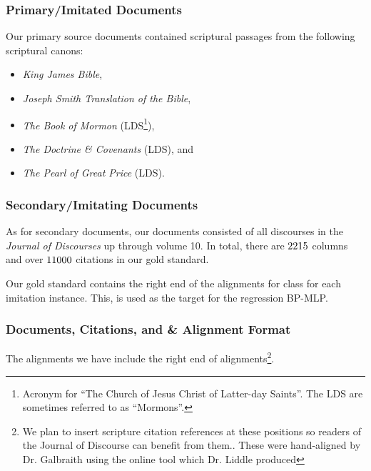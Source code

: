 \subsubsection{Primary/Imitated Documents}
Our primary source documents contained scriptural passages from the following scriptural canons:
	\begin{itemize}
		\item \textit{King James Bible},
		\item \textit{Joseph Smith Translation of the Bible},
		\item \textit{The Book of Mormon} (LDS\footnote{Acronym for ``The Church of Jesus Christ of Latter-day Saints''. The LDS are sometimes referred to as ``Mormons''.}),
		\item \textit{The Doctrine \& Covenants} (LDS), and
		\item \textit{The Pearl of Great Price} (LDS). 
	\end{itemize}

\subsubsection{Secondary/Imitating Documents}
As for secondary documents, our documents consisted of all discourses in the \textit{Journal of Discourses} up through volume 10. In total, there are $2215$ columns and over $11000$ citations in our gold standard.

Our gold standard contains the right end of the alignments for class for each imitation instance. This, is used as the target for the regression BP-MLP. %


\subsubsection{Documents, Citations, and \& Alignment Format}
The alignments we have include the right end of alignments\footnote{We plan to insert scripture citation references at these positions so readers of the Journal of Discourse can benefit from them.. These were hand-aligned by Dr. Galbraith using the online tool which Dr. Liddle produced}.

